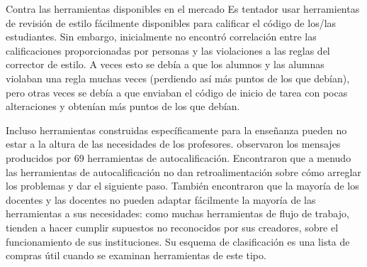 \begin{aside}{Contra las herramientas disponibles en el mercado}
Es tentador usar herramientas de revisión de estilo fácilmente disponibles para calificar el código de los/las estudiantes.
Sin embargo,
\cite{Nutb2016} inicialmente no encontró correlación entre las calificaciones proporcionadas por personas 
y las violaciones a las reglas del corrector de estilo.
A veces esto se debía a que los alumnos y las alumnas violaban una regla muchas veces 
(perdiendo así más puntos de los que debían), 
pero otras veces se debía a que enviaban el código de inicio de tarea con pocas alteraciones y obtenían más puntos de los que debían.

 Incluso herramientas construidas específicamente para la enseñanza pueden no estar a la altura de las necesidades de los profesores.
   \cite{Keun2016a,Keun2016b}  observaron los mensajes producidos por 69 herramientas de autocalificación.
  Encontraron que a menudo las herramientas de autocalificación no dan retroalimentación sobre cómo arreglar los problemas y dar el siguiente paso.
    También encontraron que la mayoría de los docentes y las docentes no pueden adaptar fácilmente la mayoría de las herramientas a sus necesidades: 
como muchas herramientas de flujo de trabajo, tienden a hacer cumplir supuestos no reconocidos por sus creadores, sobre el funcionamiento de sus instituciones.
  Su esquema de clasificación es una lista de compras útil cuando se examinan herramientas de este tipo.
\end{aside}

